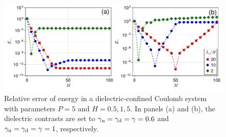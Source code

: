 \begin{figure}[htbp]
    \centering
    \includegraphics[width=0.98\linewidth]{figs/icm_elc_error.pdf}
    \caption{Relative error of energy in a dielectric-confined Coulomb system with parameters $P = 5$ and $H = 0.5, 1, 5$. In panels (a) and (b), the dielectric contrasts are set to $\gamma_{\text{u}} = \gamma_{\text{d}} = \gamma = 0.6$ and $\gamma_{\text{u}} = \gamma_{\text{d}} = \gamma = 1$, respectively.}
    \label{fig:icm_elc_error}
\end{figure}

